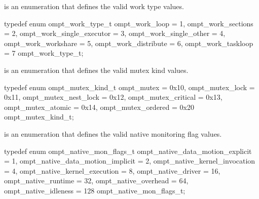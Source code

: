 
\label{sec:ompt_work_type_t}
 is an enumeration that defines the valid work type values.


\begin{ccppspecific}
\begin{omptEnum}
typedef enum ompt_work_type_t {
  ompt_work_loop               = 1,
  ompt_work_sections           = 2,
  ompt_work_single_executor    = 3,
  ompt_work_single_other       = 4,
  ompt_work_workshare          = 5,
  ompt_work_distribute         = 6,
  ompt_work_taskloop           = 7
} ompt_work_type_t;
\end{omptEnum}
\end{ccppspecific}





\label{sec:ompt_mutex_kind_t}
 is an enumeration that defines the valid mutex kind values.


\begin{ccppspecific}
\begin{omptEnum}
typedef enum ompt_mutex_kind_t {
  ompt_mutex                          = 0x10,
  ompt_mutex_lock                     = 0x11,
  ompt_mutex_nest_lock                = 0x12,
  ompt_mutex_critical                 = 0x13,
  ompt_mutex_atomic                   = 0x14,
  ompt_mutex_ordered                  = 0x20
} ompt_mutex_kind_t;
\end{omptEnum}
\end{ccppspecific}





\label{sec:ompt_native_mon_flags_t}
 is an enumeration that defines the valid native monitoring flag values.


\begin{ccppspecific}
\begin{omptEnum}
typedef enum ompt_native_mon_flags_t {
  ompt_native_data_motion_explicit    = 1,
  ompt_native_data_motion_implicit    = 2,
  ompt_native_kernel_invocation       = 4,
  ompt_native_kernel_execution        = 8,
  ompt_native_driver                  = 16,
  ompt_native_runtime                 = 32,
  ompt_native_overhead                = 64,
  ompt_native_idleness                = 128
} ompt_native_mon_flags_t;
\end{omptEnum}
\end{ccppspecific}




